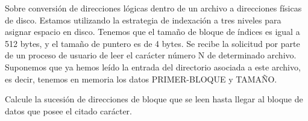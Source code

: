 \begin{ejercicio}
Sobre conversión de direcciones lógicas dentro de un archivo a direcciones físicas de disco.
Estamos utilizando la estrategia de indexación a tres niveles para asignar espacio en disco.
Tenemos que el tamaño de bloque de índices es igual a 512 bytes, y el tamaño de puntero es de 4 bytes.
Se recibe la solicitud por parte de un proceso de usuario de leer el carácter número N de determinado archivo.
Suponemos que ya hemos leído la entrada del directorio asociada a este archivo, es decir,
tenemos en memoria los datos PRIMER-BLOQUE y TAMAÑO.

Calcule la sucesión de direcciones de bloque que se leen hasta llegar al bloque de datos que posee
el citado carácter.
\begin{comment}
En primer lugar, necesitamos calcular en qué bloque se encuentra. Como el tamaño de bloque de índices es de 512 bytes, y suponemos
que el tamaño de bloque de índices es el mismo que el tamaño de bloque de datos,
entonces el bloque en el que se encuentra, sabiendo que un carácter ocupa 1 B, es:
\begin{equation*}
    \left\lfloor \frac{N}{512} \right\rfloor = \left\lfloor \frac{N}{2^9} \right\rfloor
\end{equation*}

Por tanto, necesitamos acceder al bloque de índices que contiene la dirección del bloque de datos en el que se encuentra el carácter.
Como el tamaño de puntero es de 4 bytes, entonces en cada bloque de índices hay:
\begin{equation*}
    \frac{512 \text{ B}}{4 \text{ B}} = 128=2^7 \text{ punteros}
\end{equation*}

Por tanto, el bloque de índices que contiene la dirección del bloque de datos en el que se encuentra el carácter es:
\begin{equation*}
    \left\lfloor \frac{\left\lfloor \frac{N}{2^9} \right\rfloor}{2^7} \right\rfloor = \left\lfloor \frac{N}{2^{16}} \right\rfloor
\end{equation*}
\end{comment}
\end{ejercicio}

